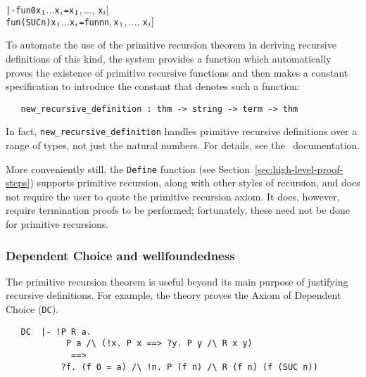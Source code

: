 \begin{hol}
\begin{alltt}
   |- fun 0 x\(\sb{1}\) \(\dots\) x\(\sb{i}\) = \m{f\sb{1}[}x\(\sb{1}\)\(,\ldots,\,\)x\(\sb{i}]\)
      fun (SUC n) x\(\sb{1}\) \(\dots\) x\(\sb{i}\) = \m{f\sb{2}[}fun n  n\(,\) x\(\sb{1}\)\(,\ldots,\,\)x\(\sb{i}]\)
\end{alltt}
\end{hol}

To automate the use of the primitive recursion theorem in deriving
recursive definitions of this kind, the \HOL{} system provides a function
which automatically proves the existence of primitive recursive
functions and then makes a constant specification to introduce the constant
that denotes such a function:

\begin{boxed}
\begin{verbatim}
   new_recursive_definition : thm -> string -> term -> thm
\end{verbatim}
\end{boxed}

\noindent In fact, {\verb+new_recursive_definition+} handles
primitive recursive definitions over a range of types, not just the
natural numbers. For details, see the \REFERENCE\ documentation.

More conveniently still, the \verb+Define+ function (see
Section~\ref{sec:high-level-proof-steps}) supports primitive
recursion, along with other styles of recursion, and does not require the
user to quote the primitive recursion axiom. It does, however, require
termination proofs to be performed; fortunately, these need not be
done for primitive recursions.

\subsubsection{Dependent Choice and wellfoundedness}
\label{prim-rec-conseq}

The primitive recursion theorem is useful beyond its main purpose of
justifying recursive definitions. For example, the theory
 proves the Axiom of Dependent Choice ({\small\verb+DC+}).

\begin{hol}
{\small
\begin{verbatim}
   DC  |- !P R a.
            P a /\ (!x. P x ==> ?y. P y /\ R x y)
             ==>
           ?f. (f 0 = a) /\ !n. P (f n) /\ R (f n) (f (SUC n))
\end{verbatim}}
\end{hol}

